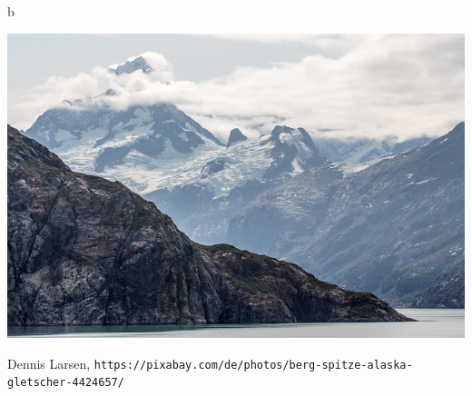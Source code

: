 \documentclass[../../main.tex]{subfiles}
\begin{document}
b

\begin{center}
\includegraphics[width=\textwidth]{mountain-4424657_640.jpg}

Dennis Larsen, \texttt{https://pixabay.com/de/photos/berg-spitze-alaska-gletscher-4424657/}
\end{center}



\mycmd
\end{document}
